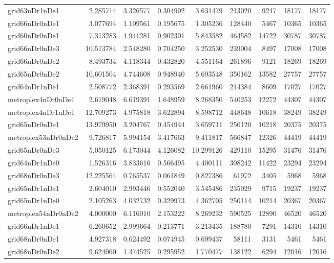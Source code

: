 \begin{longtable}{|l|r|r|r|r|r|r|r|r|}
grid63nDr1nDe1 & 2.285714 & 3.326577 & 0.304902 & 3.631479 & 213020 & 9247 & 18177 & 18177 \\
grid66nDr0nDe1 & 3.077694 & 1.109561 & 0.195675 & 1.305236 & 128440 & 5467 & 10365 & 10365 \\
grid60nDr0nDe1 & 7.313283 & 4.941281 & 0.902301 & 5.843582 & 464582 & 14722 & 30787 & 30787 \\
grid66nDr0nDe3 & 10.513784 & 2.548280 & 0.704250 & 3.252530 & 239004 & 8497 & 17008 & 17008 \\
grid66nDr0nDe2 & 8.493734 & 4.118344 & 0.432820 & 4.551164 & 261896 & 9121 & 18269 & 18269 \\
grid65nDr0nDe2 & 10.601504 & 4.744608 & 0.948940 & 5.693548 & 350162 & 13582 & 27757 & 27757 \\
grid64nDr1nDe1 & 2.508772 & 2.368391 & 0.293569 & 2.661960 & 214384 & 8609 & 17027 & 17027 \\
metroplex4nDr0nDe1 & 2.619048 & 6.619391 & 1.648959 & 8.268350 & 540253 & 12272 & 44307 & 44307 \\
metroplex4nDr1nDe1 & 12.709273 & 4.975818 & 3.622894 & 8.598712 & 448648 & 10618 & 38249 & 38249 \\
grid65nDr0nDe1 & 13.979950 & 3.204767 & 0.454944 & 3.659711 & 250120 & 10218 & 20375 & 20375 \\
metroplex53nDr0nDe2 & 9.726817 & 5.994154 & 3.417663 & 9.411817 & 566847 & 12326 & 44419 & 44419 \\
grid65nDr0nDe3 & 5.050125 & 6.173044 & 4.126082 & 10.299126 & 429110 & 15295 & 31476 & 31476 \\
grid64nDr1nDe0 & 1.526316 & 3.833616 & 0.566495 & 4.400111 & 308242 & 11422 & 23294 & 23294 \\
grid68nDr0nDe3 & 12.225564 & 0.765537 & 0.061849 & 0.827386 & 61972 & 3405 & 5968 & 5968 \\
grid65nDr1nDe1 & 2.604010 & 2.993446 & 0.552040 & 3.545486 & 235029 & 9715 & 19237 & 19237 \\
grid65nDr1nDe0 & 2.105263 & 4.032732 & 0.329973 & 4.362705 & 250114 & 10214 & 20367 & 20367 \\
metroplex54nDr0nDe2 & 4.000000 & 6.116010 & 2.153222 & 8.269232 & 590525 & 12890 & 46520 & 46520 \\
grid66nDr1nDe1 & 6.260652 & 2.999664 & 0.213771 & 3.213435 & 188780 & 7291 & 14310 & 14310 \\
grid68nDr0nDe1 & 4.927318 & 0.624492 & 0.074945 & 0.699437 & 58111 & 3131 & 5461 & 5461 \\
grid68nDr0nDe2 & 9.624060 & 1.474525 & 0.295952 & 1.770477 & 138122 & 6294 & 12016 & 12016 \\

\end{longtable}
